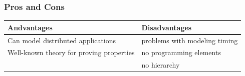 \subsubsection{Pros and Cons}
\begin{table}[h!]
\begin{tabular}{|p{}|p{}|}\hline
\textbf{Andvantages}                                          & \textbf{Disadvantages}                           \\\hline\hline
Can model distributed applications & problems with modeling timing \\\hline
Well-known theory for proving properties & no programming elements \\\hline
                                 & no hierarchy \\\hline
\end{tabular}
\end{table}










